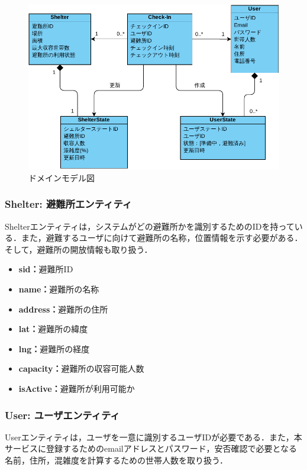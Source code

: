 \documentclass[technicalreport,dvipdfmx]{ieicej}
\begin{document}
\begin{figure}[!t]
     \begin{center}
          \includegraphics[width=\linewidth,pagebox=cropbox,clip]{img/domain_model.pdf}
          \caption{ドメインモデル図}
          \label{fig:domain}
     \end{center}
\end{figure}

\subsubsection{{\bf Shelter:} 避難所エンティティ}

Shelterエンティティは，システムがどの避難所かを識別するためのIDを持っている．また，避難するユーザに向けて避難所の名称，位置情報を示す必要がある．そして，避難所の開放情報も取り扱う．

\begin{itemize}
    \item{\textbf{sid：}}避難所ID
    \item{\textbf{name：}}避難所の名称
    \item{\textbf{address：}}避難所の住所
    \item{\textbf{lat：}}避難所の緯度
    \item{\textbf{lng：}}避難所の経度
    \item{\textbf{capacity：}}避難所の収容可能人数
    \item{\textbf{isActive：}}避難所が利用可能か
\end{itemize}

\subsubsection{{\bf User:} ユーザエンティティ}
Userエンティティは，ユーザを一意に識別するユーザIDが必要である．また，本サービスに登録するためのemailアドレスとパスワード，安否確認で必要となる名前，住所，混雑度を計算するための世帯人数を取り扱う．%
\end{document}
